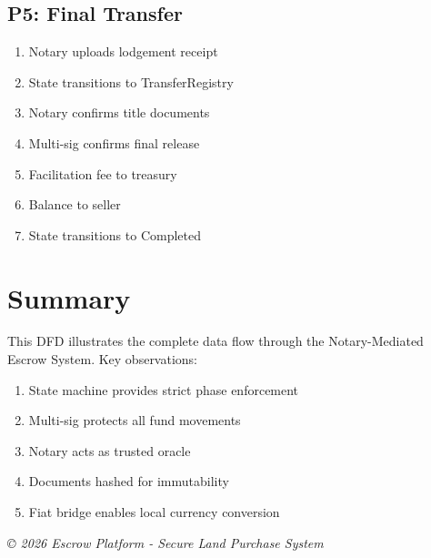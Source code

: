 \documentclass[12pt,a4paper]{article}
\begin{document}
\subsection{P5: Final Transfer}
\begin{enumerate}
\item Notary uploads lodgement receipt
\item State transitions to TransferRegistry
\item Notary confirms title documents
\item Multi-sig confirms final release
\item Facilitation fee to treasury
\item Balance to seller
\item State transitions to Completed
\end{enumerate}

\section{Summary}

This DFD illustrates the complete data flow through the Notary-Mediated Escrow System. Key observations:

\begin{enumerate}
\item State machine provides strict phase enforcement
\item Multi-sig protects all fund movements
\item Notary acts as trusted oracle
\item Documents hashed for immutability
\item Fiat bridge enables local currency conversion
\end{enumerate}

\vfill
\begin{center}
\textit{© 2026 Escrow Platform - Secure Land Purchase System}
\end{center}
\end{document}
